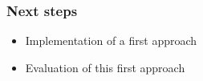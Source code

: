 \documentclass[xcolor={x11names}]{beamer}
\begin{document}

\begin{frame}
\frametitle{Next steps}
\begin{itemize}
  \item Implementation of a first approach
  \item Evaluation of this first approach
\end{itemize}
\end{frame}

\end{document}
